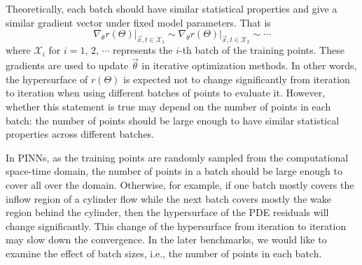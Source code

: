 Theoretically, each batch should have similar statistical properties and give a similar gradient vector under fixed model parameters.
That is
\begin{equation}
\left.\nabla_\theta r(\Theta) \right|_{\vec{x}, t \in \mathcal{X}_1} \sim
\left.\nabla_\theta r(\Theta) \right|_{\vec{x}, t \in \mathcal{X}_2} \sim
\cdots
\end{equation}
where $\mathcal{X}_i$ for $i=1$, $2$, $\cdots$ represents the $i$-th batch of the training points.
These gradients are used to update $\vec{\theta}$ in iterative optimization methods.
In other words, the hypersurface of $r(\Theta)$ is expected not to change significantly from iteration to iteration when using different batches of points to evaluate it.
However, whether this statement is true may depend on the number of points in each batch: the number of points should be large enough to have similar statistical properties across different batches.

In PINNs, as the training points are randomly sampled from the computational space-time domain, the number of points in a batch should be large enough to cover all over the domain.
Otherwise, for example, if one batch mostly covers the inflow region of a cylinder flow while the next batch covers mostly the wake region behind the cylinder, then the hypersurface of the PDE residuals will change significantly.
This change of the hypersurface from iteration to iteration may slow down the convergence.
In the later benchmarks, we would like to examine the effect of batch sizes, i.e., the number of points in each batch. 

